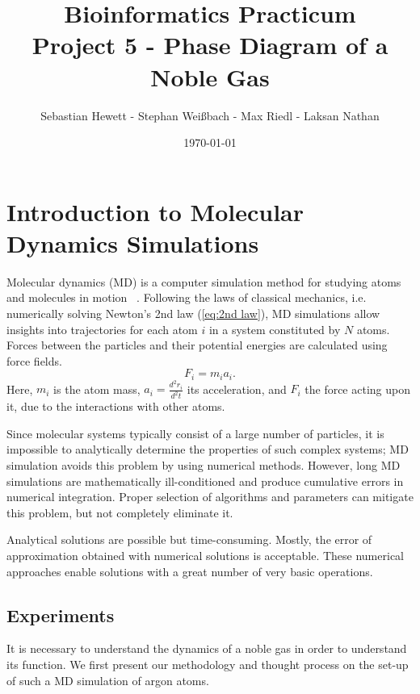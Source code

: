 \documentclass[10pt, a4paper, oneside, twocolumn]{report}
\title{Bioinformatics Practicum\\\textbf{Project 5 - Phase Diagram of a Noble Gas}}
\author{Sebastian Hewett - Stephan Weißbach - Max Riedl - Laksan Nathan}
\date{\today}
\begin{document}
\maketitle

\chapter{Introduction to Molecular Dynamics Simulations}

Molecular dynamics (MD) is a computer simulation method for studying atoms and molecules in motion ~\cite{Gonzalez}. Following the laws of classical mechanics, i.e. numerically solving Newton's 2nd law (\ref{eq:2nd law}), MD simulations allow insights into trajectories for each atom \(i\) in a system constituted by \(N\) atoms. Forces between the particles and their potential energies are calculated using force fields.
\begin{equation}\label{eq:2nd law}
F_i = m_i a_i.
\end{equation} %
Here, \(m_i\) is the atom mass, \(a_i = \frac{d^{2}r_i}{d^{2}t}\) its acceleration, and \(F_i\) the force acting upon it, due to the interactions with other atoms.

Since molecular systems typically consist of a large number of particles, it is impossible to analytically determine the properties of such complex systems; MD simulation avoids this problem by using numerical methods. However, long MD simulations are mathematically ill-conditioned and produce cumulative errors in numerical integration. Proper selection of algorithms and parameters can mitigate this problem, but not completely eliminate it.

Analytical solutions are possible but time-consuming. Mostly, the error of approximation obtained with numerical solutions is acceptable. These numerical approaches enable solutions with a great number of very basic operations.

\section{Experiments}

It is necessary to understand the dynamics of a noble gas in order to understand its function. We first present our methodology and thought process on the set-up of such a MD simulation of argon atoms.
\end{document}
